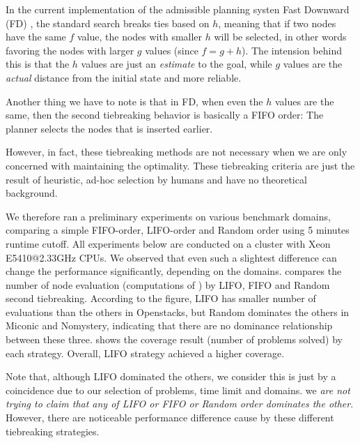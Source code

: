 In the current implementation of the \sota admissible planning systen Fast Downward (FD) \cite{Helmert2006}, the standard \astar search breaks ties based on $h$, meaning that if two nodes have the same $f$ value, the nodes with smaller $h$ will be selected, in other words favoring the nodes with larger $g$ values (since $f=g+h$). The intension behind this is that the $h$ values are just an \emph{estimate} to the goal, while $g$ values are the \emph{actual} distance from the initial state and more reliable.

Another thing we have to note is that in FD, when even the $h$ values are the same, then the second tiebreaking behavior is basically a FIFO order: The planner selects the nodes that is inserted earlier. 

However, in fact, these tiebreaking methods are not necessary when we are only concerned with  maintaining the optimality. These tiebreaking criteria are just the result of heuristic, ad-hoc selection by humans and have no theoretical background.

We therefore ran a preliminary experiments on various benchmark domains, comparing a simple FIFO-order, LIFO-order and Random order using 5 minutes runtime cutoff. 
All experiments below are conducted on a cluster with Xeon E5410@2.33GHz CPUs.
We observed that even such a slightest difference can change the performance significantly, depending on the domains.
 compares the number of node evaluation (computations of \lmcut)
by LIFO, FIFO and Random second tiebreaking.
According to the figure, LIFO has smaller number of evaluations than the others in Openstacks, but Random dominates the others in Miconic and Nomystery, indicating that there are no dominance relationship between these three.
 shows the coverage result (number of problems solved) by each strategy.
Overall, LIFO strategy achieved a higher coverage.

Note that, although LIFO dominated the others, we consider this is just by a coincidence due to our selection of problems, time limit and domains. we \emph{are not trying to claim that any of LIFO or FIFO or Random order dominates the other}. However, there are noticeable performance difference cause by these different tiebreaking strategies.

